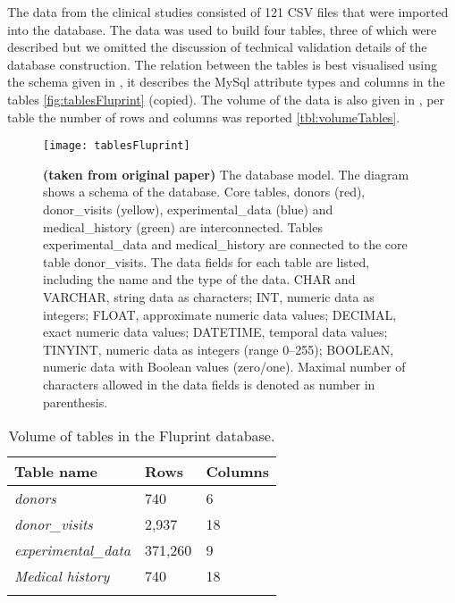 The data from the clinical studies consisted of 121 CSV files that were imported into the \flup database.
The data was used to build four tables, three of which were described but we omitted the discussion of technical validation details of the database construction.
The relation between the tables is best visualised using the schema given in \dpaper, it describes the MySql attribute types and columns in the tables \autoref{fig:tablesFluprint} (copied).
The volume of the data is also given in \dpaper, per table the number of rows and columns was reported \autoref{tbl:volumeTables}.

\begin{figure}[htpb]
    \texttt{[image: tablesFluprint]}
    \caption{
        \textbf{(taken from original paper)} The \flup database model.
        The diagram shows a schema of the \flup database.
        Core tables, donors (red), donor\_visits (yellow), experimental\_data (blue) and medical\_history (green) are interconnected.
        Tables experimental\_data and medical\_history are connected to the core table donor\_visits.
        The data fields for each table are listed, including the name and the type of the data.
        CHAR and VARCHAR, string data as characters; INT, numeric data as integers; FLOAT, approximate numeric data values; DECIMAL, exact numeric data values; DATETIME, temporal data values; TINYINT, numeric data as integers (range 0–255); BOOLEAN, numeric data with Boolean values (zero/one).
        Maximal number of characters allowed in the data fields is denoted as number in parenthesis.
    }\label{fig:tablesFluprint}
\end{figure}

\begin{table}[htpb]
    \centering
    \begin{tabular}{lll}
        \toprule{}
        \textbf{Table name} & \textbf{Rows} & \textbf{Columns} \\
        \midrule{}
        \textit{donors} &  740 & 6 \\
        \textit{donor\_visits} & 2,937 & 18 \\
        \textit{experimental\_data} & 371,260 & 9 \\
        \textit{Medical history} & 740 & 18 \\
    \bottomrule{}
    \end{tabular}
    \caption{Volume of tables in the Fluprint database.}\label{tbl:volumeTables}
\end{table}

